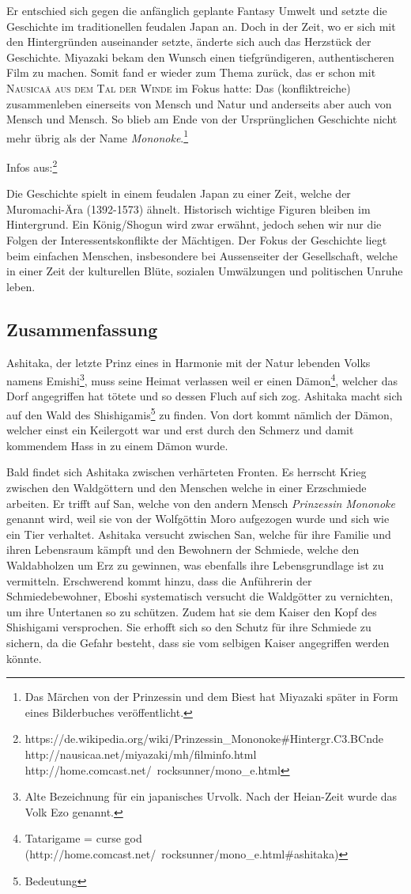 Er entschied sich gegen die anfänglich geplante Fantasy Umwelt und setzte die Geschichte im traditionellen feudalen Japan an. Doch in der Zeit, wo er sich mit den Hintergründen auseinander setzte, änderte sich auch das Herzstück der Geschichte. Miyazaki bekam den Wunsch einen tiefgründigeren, authentischeren Film zu machen. Somit fand er wieder zum Thema zurück, das er schon mit \textsc{Nausicaä aus dem Tal der Winde} im Fokus hatte: Das (konfliktreiche) zusammenleben einerseits von Mensch und Natur und anderseits aber auch von Mensch und Mensch. So blieb am Ende von der Ursprünglichen Geschichte nicht mehr übrig als der Name \emph{Mononoke}.\footnote{Das Märchen von der Prinzessin und dem Biest hat Miyazaki später in Form eines Bilderbuches veröffentlicht.} 

Infos aus:\footnote{https://de.wikipedia.org/wiki/Prinzessin\_Mononoke\#Hintergr.C3.BCnde http://nausicaa.net/miyazaki/mh/filminfo.html http://home.comcast.net/~rocksunner/mono\_e.html}

Die Geschichte spielt in einem feudalen Japan zu einer Zeit, welche der Muromachi-Ära (1392-1573) ähnelt. Historisch wichtige Figuren bleiben im Hintergrund. Ein König/Shogun wird zwar erwähnt, jedoch sehen wir nur die Folgen der Interessentskonflikte der Mächtigen. Der Fokus der Geschichte liegt beim einfachen Menschen, insbesondere bei Aussenseiter der Gesellschaft, welche in einer Zeit der kulturellen Blüte, sozialen Umwälzungen und politischen Unruhe leben. 

\subsection{Zusammenfassung}
Ashitaka, der letzte Prinz eines in Harmonie mit der Natur lebenden Volks namens Emishi\footnote{Alte Bezeichnung für ein japanisches Urvolk. Nach der Heian-Zeit wurde das Volk Ezo genannt.}, muss seine Heimat verlassen weil er einen Dämon\footnote{Tatarigame = curse god (http://home.comcast.net/~rocksunner/mono\_e.html\#ashitaka)}, welcher das Dorf angegriffen hat tötete und so dessen Fluch auf sich zog. Ashitaka macht sich auf den Wald des Shishigamis\footnote{Bedeutung} zu finden. Von dort kommt nämlich der Dämon, welcher einst ein Keilergott war und erst durch den Schmerz und damit kommendem Hass in zu einem Dämon wurde. 

Bald findet sich Ashitaka zwischen verhärteten Fronten. Es herrscht Krieg zwischen den Waldgöttern und den Menschen welche in einer Erzschmiede arbeiten. Er trifft auf San, welche von den andern Mensch \emph{Prinzessin Mononoke} genannt wird, weil sie von der Wolfgöttin Moro aufgezogen wurde und sich wie ein Tier verhaltet. Ashitaka versucht zwischen San, welche für ihre Familie und ihren Lebensraum kämpft und den Bewohnern der Schmiede, welche den Waldabholzen um Erz zu gewinnen, was ebenfalls ihre Lebensgrundlage ist zu vermitteln. Erschwerend kommt hinzu, dass die Anführerin der Schmiedebewohner, Eboshi systematisch versucht die Waldgötter zu vernichten, um ihre Untertanen so zu schützen. Zudem hat sie dem Kaiser den Kopf des Shishigami versprochen. Sie erhofft sich so den Schutz für ihre Schmiede zu sichern, da die Gefahr besteht, dass sie vom selbigen Kaiser angegriffen werden könnte. 


